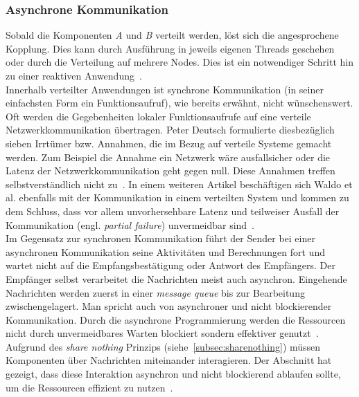 \subsubsection{Asynchrone Kommunikation}
Sobald die Komponenten \textit{A} und \textit{B} verteilt werden, löst sich die angesprochene Kopplung. Dies kann durch Ausführung in jeweils eigenen Threads geschehen oder durch die Verteilung auf mehrere Nodes. Dies ist ein notwendiger Schritt hin zu einer reaktiven Anwendung~\cite[S.~22]{kuhn_reactive_2015}.\\
Innerhalb verteilter Anwendungen ist synchrone Kommunikation (in seiner einfachsten Form ein Funktionsaufruf), wie bereits erwähnt, nicht wünschenswert. Oft werden die Gegebenheiten lokaler Funktionsaufrufe auf eine verteile Netzwerkkommunikation übertragen. Peter Deutsch formulierte diesbezüglich sieben Irrtümer bzw. Annahmen, die im Bezug auf verteile Systeme gemacht werden. Zum Beispiel die Annahme ein Netzwerk wäre ausfallsicher oder die Latenz der Netzwerkkommunikation geht gegen null. Diese Annahmen treffen selbstverständlich nicht zu~\cite[S.~1]{rotem_fallacies_2008}. In einem weiteren Artikel beschäftigen sich Waldo et al. ebenfalls mit der Kommunikation in einem verteilten System und kommen zu dem Schluss, dass vor allem unvorhersehbare Latenz und teilweiser Ausfall der Kommunikation (engl. \textit{partial failure}) unvermeidbar sind~\cite{waldo_note_1994}.\\
Im Gegensatz zur synchronen Kommunikation führt der Sender bei einer asynchronen Kommunikation seine Aktivitäten und Berechnungen fort und wartet nicht auf die Empfangsbestätigung oder Antwort des Empfängers. Der Empfänger selbst verarbeitet die Nachrichten meist auch asynchron. Eingehende Nachrichten werden zuerst in einer \textit{message queue} bis zur Bearbeitung zwischengelagert. Man spricht auch von asynchroner und nicht blockierender Kommunikation. Durch die asynchrone Programmierung werden die Ressourcen nicht durch unvermeidbares Warten blockiert sondern effektiver genutzt~\cite[S.~48]{kuhn_reactive_2015}.\\

Aufgrund des \textit{share nothing} Prinzips (siehe~\ref{subsec:sharenothing}) müssen Komponenten über Nachrichten miteinander interagieren. Der Abschnitt hat gezeigt, dass diese Interaktion asynchron und nicht blockierend ablaufen sollte, um die Ressourcen effizient zu nutzen~\cite[S.~48~\&~S.~49]{kuhn_reactive_2015}.

\pagebreak

